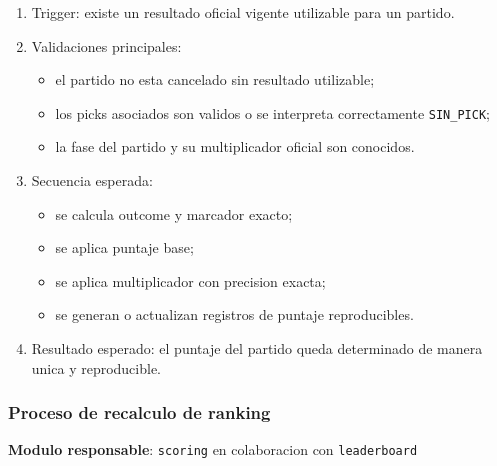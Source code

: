 \begin{enumerate}
  \item Trigger: existe un resultado oficial vigente utilizable para un partido.
  \item Validaciones principales:
    \begin{itemize}
      \item el partido no esta cancelado sin resultado utilizable;
      \item los picks asociados son validos o se interpreta correctamente \texttt{SIN\_PICK};
      \item la fase del partido y su multiplicador oficial son conocidos.
    \end{itemize}
  \item Secuencia esperada:
    \begin{itemize}
      \item se calcula outcome y marcador exacto;
      \item se aplica puntaje base;
      \item se aplica multiplicador con precision exacta;
      \item se generan o actualizan registros de puntaje reproducibles.
    \end{itemize}
  \item Resultado esperado: el puntaje del partido queda determinado de manera unica y reproducible.
\end{enumerate}

\subsubsection{Proceso de recalculo de ranking}

\textbf{Modulo responsable}: \texttt{scoring} en colaboracion con \texttt{leaderboard}

